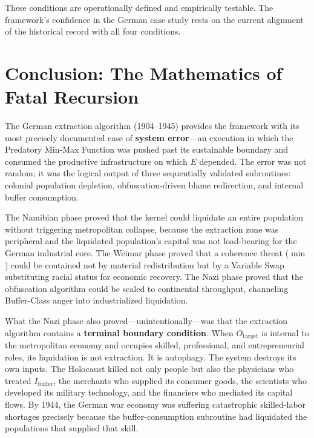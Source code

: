 These conditions are operationally defined and empirically testable. The framework's confidence in the German case study rests on the current alignment of the historical record with all four conditions.

\section{Conclusion: The Mathematics of Fatal Recursion}
\label{sec:german_conclusion}

The German extraction algorithm (1904--1945) provides the framework with its most precisely documented case of \textbf{system error}---an execution in which the Predatory Min-Max Function was pushed past its sustainable boundary and consumed the productive infrastructure on which $E$ depended. The error was not random; it was the logical output of three sequentially validated subroutines: colonial population depletion, obfuscation-driven blame redirection, and internal buffer consumption.

The Namibian phase proved that the kernel could liquidate an entire population without triggering metropolitan collapse, because the extraction zone was peripheral and the liquidated population's capital was not load-bearing for the German industrial core. The Weimar phase proved that a coherence threat ($\min$) could be contained not by material redistribution but by a Variable Swap substituting racial status for economic recovery. The Nazi phase proved that the obfuscation algorithm could be scaled to continental throughput, channeling Buffer-Class anger into industrialized liquidation.

What the Nazi phase also proved---unintentionally---was that the extraction algorithm contains a \textbf{terminal boundary condition}. When $O_{\text{target}}$ is internal to the metropolitan economy and occupies skilled, professional, and entrepreneurial roles, its liquidation is not extraction. It is autophagy. The system destroys its own inputs. The Holocaust killed not only people but also the physicians who treated $I_{\text{buffer}}$, the merchants who supplied its consumer goods, the scientists who developed its military technology, and the financiers who mediated its capital flows. By 1944, the German war economy was suffering catastrophic skilled-labor shortages precisely because the buffer-consumption subroutine had liquidated the populations that supplied that skill.

